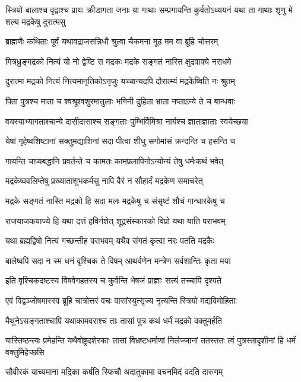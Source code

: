 स्त्रियो बालाश्च वृद्वाश्च प्रायः क्रीडागता जनाः
\twolineshloka
{या गाथाः सम्प्रगायन्ति कुर्वतोऽध्ययनं यथा}
{ता गाथाः शृणु मे शल्य मद्रकेषु दुरात्मसु}


\twolineshloka
{ब्राह्मणैः कथिताः पूर्वं यथावद्राजसन्निधौ}
{श्रुत्वा चैकमना मूढ मम वा ब्रूहि चोत्तरम्}


\twolineshloka
{मित्रध्रुङ्मद्रको नित्यं यो नो द्वेष्टि स मद्रकः}
{मद्रके सङ्गतं नास्ति क्षुद्रवाक्ये नराधमे}


\twolineshloka
{दुरात्मा मद्रको नित्यं नित्यमानृतिकोऽनृजुः}
{यच्चान्यदपि दौरात्म्यं मद्रकेष्विति नः श्रुतम्}


\twolineshloka
{पिता पुत्रश्च माता च श्वश्रूश्वशुरमातुलाः}
{भगिनी दुहिता भ्राता नप्ताऽन्ये ते च बान्धवाः}


\twolineshloka
{वयस्याभ्यागताश्चान्ये दासीदासाश्च सङ्गताः}
{पुम्भिर्विमिश्रा नार्यश्च ज्ञाताज्ञाताः स्वयेच्छया}


\twolineshloka
{येषां गृहेष्वशिष्टानां सक्तुमद्याशिनां सदा}
{पीत्वा शीधु सगोमांसं क्रन्दन्ति च हसन्ति च}


\twolineshloka
{गायन्ति चाप्यबद्धानि प्रवर्तन्ते च कामतः}
{कामप्रलापिनोऽन्योन्यं तेषु धर्मःकथं भवेत्}


\twolineshloka
{मद्रकेष्ववलिप्तेषु प्रख्याताशुभकर्मसु}
{नापि वैरं न सौहार्दं मद्रकेण समाचरेत्}


\twolineshloka
{मद्रके सङ्गतं नास्ति मद्रको हि सदा मलः}
{मद्रकेषु च संसृष्टं शौचं गान्धारकेषु च}


\twolineshloka
{राजयाजकयाज्ये हि यथा दत्तं हविर्नशेत्}
{शूद्रसंस्कारको विप्रो यथा याति पराभवम्}


\twolineshloka
{यथा ब्रह्मद्विषो नित्यं गच्छन्तीह पराभवम्}
{यथैव संगतं कृत्वा नरः पतति मद्रकैः}


\twolineshloka
{बालेष्वपि सदा न स्म धनं वृश्चिक ते विषम्}
{आथर्वणेन मन्त्रेण सर्वशान्तिः कृता मया}


\twolineshloka
{इति वृश्चिकदष्टस्य विषवेगहतस्य च}
{कुर्वन्ति भेषजं प्राज्ञाः सत्यं तच्चापि दृश्यते}


\twolineshloka
{एवं विद्वञ्जोषमास्स्व ब्रूहि चात्रोत्तरं वचः}
{वासांस्युत्सृज्य नृत्यन्ति स्त्रियो मद्यविमोहिताः}


\twolineshloka
{मैथुनेऽसङ्गताश्चापि यथाकामवराश्च ताः}
{तासां पुत्र कथं धर्मं मद्रको वक्तुमर्हति}


\threelineshloka
{यास्तिष्ठन्त्यः प्रमेहन्ति यथैवोष्ट्रदशेरकाः}
{तासां विभ्रष्टधर्माणां निर्लज्जानां ततस्ततः}
{त्वं पुत्रस्तादृशीनां हि धर्मं वक्तुमिहेच्छसि}


\twolineshloka
{सौवीरकं याच्यमाना मद्रिका कर्षति स्फिचौ}
{अदातुकामा वचनमिदं वदति दारुणम्}


